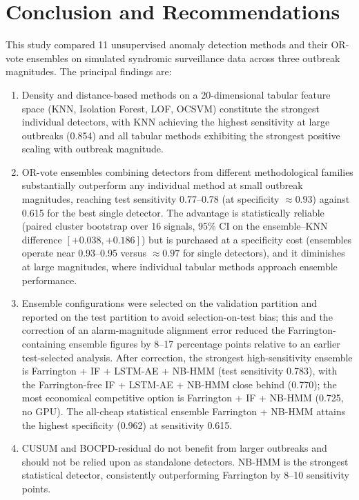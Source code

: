 \documentclass[11pt]{article}
\begin{document}
\section{Conclusion and Recommendations}

This study compared 11 unsupervised anomaly detection methods and their OR-vote ensembles on simulated syndromic surveillance data across three outbreak magnitudes. The principal findings are:

\begin{enumerate}
\item Density and distance-based methods on a 20-dimensional tabular feature space (KNN, Isolation Forest, LOF, OCSVM) constitute the strongest individual detectors, with KNN achieving the highest sensitivity at large outbreaks (0.854) and all tabular methods exhibiting the strongest positive scaling with outbreak magnitude.

\item OR-vote ensembles combining detectors from different methodological families substantially outperform any individual method at small outbreak magnitudes, reaching test sensitivity 0.77--0.78 (at specificity $\approx 0.93$) against 0.615 for the best single detector. The advantage is statistically reliable (paired cluster bootstrap over 16 signals, 95\% CI on the ensemble--KNN difference $[+0.038, +0.186]$) but is purchased at a specificity cost (ensembles operate near 0.93--0.95 versus $\approx 0.97$ for single detectors), and it diminishes at large magnitudes, where individual tabular methods approach ensemble performance.

\item Ensemble configurations were selected on the validation partition and reported on the test partition to avoid selection-on-test bias; this and the correction of an alarm-magnitude alignment error reduced the Farrington-containing ensemble figures by 8--17 percentage points relative to an earlier test-selected analysis. After correction, the strongest high-sensitivity ensemble is Farrington + IF + LSTM-AE + NB-HMM (test sensitivity 0.783), with the Farrington-free IF + LSTM-AE + NB-HMM close behind (0.770); the most economical competitive option is Farrington + IF + NB-HMM (0.725, no GPU). The all-cheap statistical ensemble Farrington + NB-HMM attains the highest specificity (0.962) at sensitivity 0.615.

\item CUSUM and BOCPD-residual do not benefit from larger outbreaks and should not be relied upon as standalone detectors. NB-HMM is the strongest statistical detector, consistently outperforming Farrington by 8--10 sensitivity points.


\end{enumerate}
\end{document}
